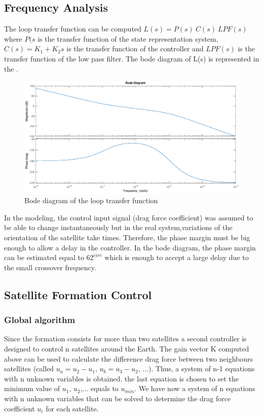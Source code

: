 \subsection{Frequency Analysis}
The loop transfer function can be computed $L(s) = P(s) \ C(s) \ LPF(s)$ where $P(s$ is the transfer function of the state representation system, $C(s) = K_1 + K_2 s$ is the transfer function of the controller and $LPF(s)$ is the transfer function of the low pass filter.
The bode diagram of L(s) is represented in the . \\
\begin{figure}[H]
	\centering
	\includegraphics[width=0.9\linewidth]
	{figures/Bode_L.eps}
	\caption{Bode diagram of the loop transfer function}
	\label{fig:Bode_L}
\end{figure}
In the modeling, the control input signal (drag force coefficient) was assumed to be able to change instantaneously but in the real system,variations of the orientation of the satellite take times. Therefore, the phase margin must be big enough to allow a delay in the controller. In the bode diagram, the phase margin can be estimated equal to $62^{circ}$ which is enough to accept a large delay due to the small crossover frequency. \\

\subsection{Satellite Formation Control} 
\subsubsection{Global algorithm}
Since the formation consists for more than two satellites a second controller is designed to control n satellites around the Earth. The gain vector K computed above can be used to calculate the difference drag force between two neighbours satellites (called $u_a = u_2 - u_1$, $u_b = u_3 - u_2$, ...). Thus, a system of n-1 equations with n unknown variables is obtained. the last equation is chosen to set the minimum value of $u_1$, $u_2$,... equals to $u_{min}$. We have now a system of n equations with n unknown variables that can be solved to determine the drag force coefficient $u_i$ for each satellite.
